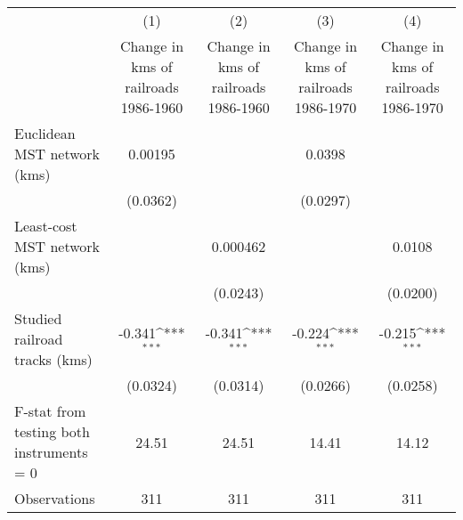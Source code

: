 {
\def\sym#1{\ifmmode^{#1}\else\(^{#1}\)\fi}
\begin{tabular}{l*{4}{c}}
\hline\hline
                &\multicolumn{1}{c}{(1)}&\multicolumn{1}{c}{(2)}&\multicolumn{1}{c}{(3)}&\multicolumn{1}{c}{(4)}\\
                &\multicolumn{1}{c}{Change in kms of railroads 1986-1960}&\multicolumn{1}{c}{Change in kms of railroads 1986-1960}&\multicolumn{1}{c}{Change in kms of railroads 1986-1970}&\multicolumn{1}{c}{Change in kms of railroads 1986-1970}\\
\hline
Euclidean MST network (kms)&  0.00195         &                  &   0.0398         &                  \\
                & (0.0362)         &                  & (0.0297)         &                  \\
[1em]
Least-cost MST network (kms)&                  & 0.000462         &                  &   0.0108         \\
                &                  & (0.0243)         &                  & (0.0200)         \\
[1em]
Studied railroad tracks (kms)&   -0.341\sym{***}&   -0.341\sym{***}&   -0.224\sym{***}&   -0.215\sym{***}\\
                & (0.0324)         & (0.0314)         & (0.0266)         & (0.0258)         \\
\hline
F-stat from testing both instruments = 0&    24.51         &    24.51         &    14.41         &    14.12         \\
Observations    &      311         &      311         &      311         &      311         \\
\hline\hline
\end{tabular}
}
